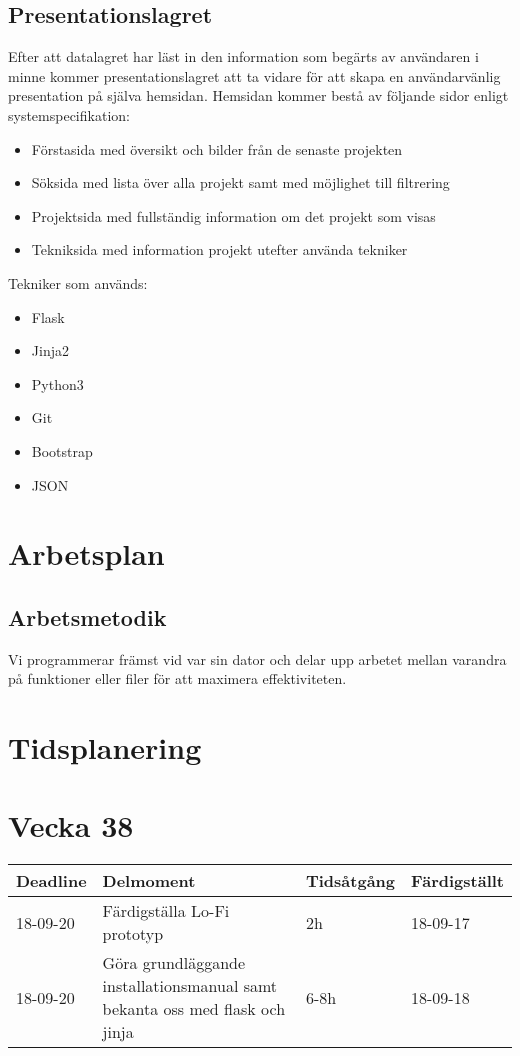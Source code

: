 \documentclass{TDP003mall}
\begin{document}
\subsection{Presentationslagret}
Efter att datalagret har läst in den information som begärts av användaren
i minne kommer presentationslagret att ta vidare för att skapa en
användarvänlig presentation på själva hemsidan. Hemsidan kommer bestå av
följande sidor enligt systemspecifikation:
\begin{itemize}
\item Förstasida med översikt och bilder från de senaste projekten
\item Söksida med lista över alla projekt samt med möjlighet till filtrering
\item Projektsida med fullständig information om det projekt som visas
\item Tekniksida med information projekt utefter använda tekniker
\end{itemize}
Tekniker som används:
\begin{itemize}
\item Flask
\item Jinja2
\item Python3
\item Git
\item Bootstrap
\item JSON
\end{itemize}
\section{Arbetsplan}
\subsection{Arbetsmetodik}
Vi programmerar främst vid var sin dator och delar upp arbetet mellan
varandra på funktioner eller filer för att maximera effektiviteten.
\section{Tidsplanering}

\section{Vecka 38}
\begin{table}[!h]
\begin{tabularx}{\linewidth}{|l|X|l|l|}
\hline
\textbf{Deadline} & \textbf{Delmoment} & \textbf{Tidsåtgång} & \textbf{Färdigställt}\\\hline
18-09-20 & Färdigställa Lo-Fi prototyp & 2h & 18-09-17  \\\hline
18-09-20 & Göra grundläggande installationsmanual samt bekanta
oss med flask och jinja & 6-8h & 18-09-18 \\\hline
\end{tabularx}
\end{table}
\end{document}
